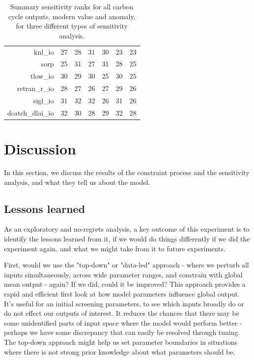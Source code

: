 \documentclass[gmd, manuscript]{copernicus}
\begin{document}
\begin{table}[ht]
\begin{tabular}{rrrrrrr}
  knl\_io & 27 & 28 & 31 & 30 & 23 & 23 \\ 
  sorp & 25 & 31 & 27 & 31 & 28 & 25 \\ 
  tlow\_io & 30 & 29 & 30 & 25 & 30 & 25 \\ 
  retran\_r\_io & 28 & 27 & 26 & 27 & 29 & 26 \\ 
  sigl\_io & 31 & 32 & 32 & 26 & 31 & 26 \\ 
  dcatch\_dlai\_io & 32 & 30 & 28 & 29 & 32 & 28 \\ 
   \hline
\end{tabular}
\caption{Summary sensitivity ranks for all carbon cycle outputs, modern value and anomaly, for three different types of sensitivity analysis.}
\label{tab:sensitivity_ranks}
\end{table}



\section{Discussion}\label{sec:discussion}
In this section, we discuss the results of the constraint process and the sensitivity analysis, and what they tell us about the model.

\subsection{Lessons learned}\label{ssec:lessons}

As an exploratory and no-regrets analysis, a key outcome of this experiment is to identify the lessons learned from it, if we would do things differently if we did the experiment again, and what we might take from it to future experiments.

First, would we use  the "top-down" or "data-led" approach - where we perturb all inputs simultaneously, across wide parameter ranges, and constrain with global mean output - again? If we did, could it be improved? This approach provides a rapid and efficient first look at how model parameters influence global output. It's useful for an initial screening parameters, to see which inputs broadly do or do not effect our outputs of interest. It reduces the chances that there may be some unidentified parts of input space where the model would perform better - perhaps we have some discrepancy that can easily be resolved through tuning. The top-down approach might help us set parameter boundaries in situations where there is not strong prior knowledge about what parameters should be.
\end{document}
